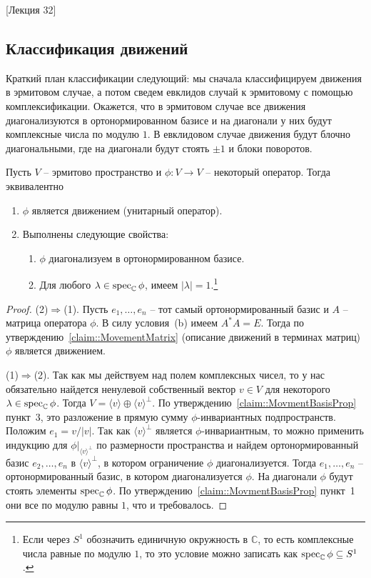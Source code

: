 [Лекция 32]

\subsection{Классификация движений}

Краткий план классификации следующий: мы сначала классифицируем движения в эрмитовом случае, а потом сведем евклидов случай к эрмитовому с помощью комплексификации. Окажется, что в эрмитовом случае все движения диагонализуются в ортонормированном базисе и на диагонали у них будут комплексные числа по модулю $1$. В евклидовом случае движения будут блочно диагональными, где на диагонали будут стоять $\pm1$ и блоки поворотов.

\begin{claim}\label{claim::HermMoveClassific}
Пусть $V$ -- эрмитово пространство и $\phi\colon V\to V$ -- некоторый оператор. Тогда эквивалентно
\begin{enumerate}
\item $\phi$ является движением (унитарный оператор).
\item Выполнены следующие свойства:
\begin{enumerate}
\item $\phi$ диагонализуем в ортонормированном базисе.
\item Для любого $\lambda\in\operatorname{spec}_\mathbb C\phi$, имеем $|\lambda| = 1$.\footnote{Если через $S^1$ обозначить единичную окружность в $\mathbb C$, то есть комплексные числа равные по модулю $1$, то это условие можно записать как $\operatorname{spec}_\mathbb C\phi \subseteq S^1$.}
\end{enumerate}
\end{enumerate}
\end{claim}
\begin{proof}
(2)$\Rightarrow$(1). Пусть $e_1,\ldots,e_n$ -- тот самый ортонормированный базис и $A$ -- матрица оператора $\phi$. В силу условия~(b) имеем $A^*A = E$. Тогда по утверждению~\ref{claim::MovementMatrix} (описание движений в терминах матриц) $\phi$ является движением.

(1)$\Rightarrow$(2). Так как мы действуем над полем комплексных чисел, то у нас обязательно найдется ненулевой собственный вектор $v\in V$ для некоторого $\lambda\in\operatorname{spec}_\mathbb C\phi$. Тогда $V = \langle v\rangle \oplus \langle v\rangle^\bot$. По утверждению~\ref{claim::MovmentBasisProp} пункт~3, это разложение в прямую сумму $\phi$-инвариантных подпространств. Положим $e_1 = v/|v|$. Так как $\langle v\rangle^\bot$ является $\phi$-инвариантным, то можно применить индукцию для $\phi|_{\langle v \rangle^\bot}$  по размерности пространства и найдем ортонормированный базис $e_2,\ldots,e_n$ в $\langle v\rangle^\bot$, в котором ограничение $\phi$ диагонализуется. Тогда $e_1,\ldots,e_n$ -- ортонормированный базис, в котором диагонализуется $\phi$. На диагонали $\phi$ будут стоять элементы $\operatorname{spec}_\mathbb C\phi$. По утверждению~\ref{claim::MovmentBasisProp} пункт~1 они все по модулю равны $1$, что и требовалось.
\end{proof}

